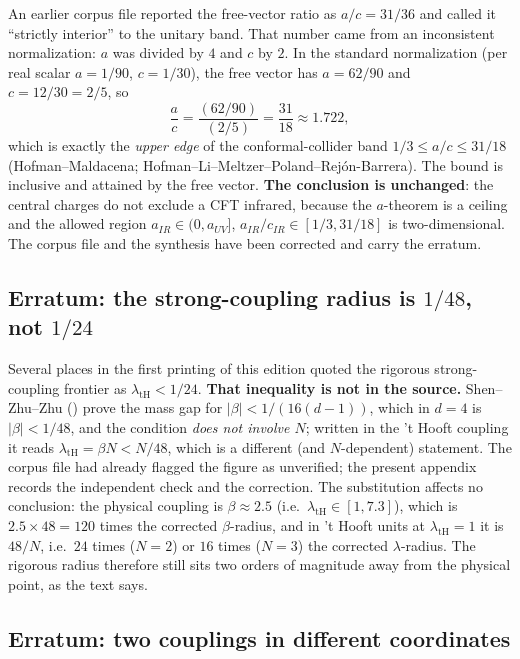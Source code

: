 An earlier corpus file reported the free-vector ratio as $a/c=31/36$ and called it ``strictly
interior'' to the unitary band. That number came from an inconsistent normalization: $a$ was
divided by $4$ and $c$ by $2$. In the standard normalization (per real scalar $a=1/90$,
$c=1/30$), the free vector has $a=62/90$ and $c=12/30=2/5$, so
\[
\frac ac=\frac{(62/90)}{(2/5)}=\frac{31}{18}\approx1.722 ,
\]
which is exactly the \emph{upper edge} of the conformal-collider band $1/3\le a/c\le31/18$
(Hofman--Maldacena; Hofman--Li--Meltzer--Poland--Rej\'on-Barrera). The bound is inclusive and
attained by the free vector. \textbf{The conclusion is unchanged}: the central charges do not
exclude a CFT infrared, because the $a$-theorem is a ceiling and the allowed region
$a_{IR}\in(0,a_{UV}]$, $a_{IR}/c_{IR}\in[1/3,31/18]$ is two-dimensional. The corpus file
 and the synthesis  have been corrected and carry
the erratum.

\subsection{Erratum: the strong-coupling radius is $1/48$, not $1/24$}
\label{app:erratum-radius}

Several places in the first printing of this edition quoted the rigorous strong-coupling frontier
as $\lambda_{\mathrm{tH}}<1/24$. \textbf{That inequality is not in the source.} Shen--Zhu--Zhu
() prove the mass gap for $\lvert\beta\rvert<1/(16(d-1))$, which in $d=4$
is $\lvert\beta\rvert<1/48$, and the condition \emph{does not involve $N$}; written in the 't
Hooft coupling it reads $\lambda_{\mathrm{tH}}=\beta N<N/48$, which is a different (and
$N$-dependent) statement. The corpus file  had already flagged the figure
as unverified; the present appendix records the independent check and the correction. The
substitution affects no conclusion: the physical coupling is $\beta\approx2.5$ (i.e.\
$\lambda_{\mathrm{tH}}\in[1,7.3]$), which is $2.5\times48=120$ times the corrected $\beta$-radius,
and in 't Hooft units at $\lambda_{\mathrm{tH}}=1$ it is $48/N$, i.e.\ $24$ times ($N=2$) or $16$
times ($N=3$) the corrected $\lambda$-radius. The rigorous radius therefore still sits two orders
of magnitude away from the physical point, as the text says.

\subsection{Erratum: two couplings in different coordinates}
\label{app:erratum-balaban}

